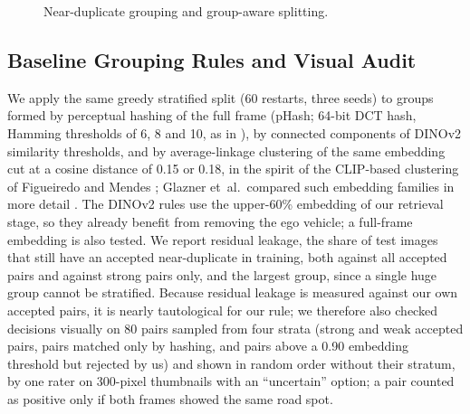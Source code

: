 \documentclass[conference,a4paper]{IEEEtran}
\begin{document}
\begin{figure}[t]
\centering
{}
\caption{Near-duplicate grouping and group-aware splitting.}
\label{fig:pipeline}
\end{figure}

\subsection{Baseline Grouping Rules and Visual Audit}
\label{sec:baselines}
We apply the same greedy stratified split (60 restarts, three seeds) to groups formed by perceptual hashing of the full frame (pHash; 64-bit DCT hash, Hamming thresholds of 6, 8 and 10, as in \cite{babu2024leakage}), by connected components of DINOv2 similarity thresholds, and by average-linkage clustering of the same embedding cut at a cosine distance of 0.15 or 0.18, in the spirit of the CLIP-based clustering of Figueiredo and Mendes \cite{figueiredo2024leakage}; Glazner et~al.\ compared such embedding families in more detail \cite{glazner2026findleak}. The DINOv2 rules use the upper-60\% embedding of our retrieval stage, so they already benefit from removing the ego vehicle; a full-frame embedding is also tested. We report residual leakage, the share of test images that still have an accepted near-duplicate in training, both against all accepted pairs and against strong pairs only, and the largest group, since a single huge group cannot be stratified. Because residual leakage is measured against our own accepted pairs, it is nearly tautological for our rule; we therefore also checked decisions visually on 80 pairs sampled from four strata (strong and weak accepted pairs, pairs matched only by hashing, and pairs above a 0.90 embedding threshold but rejected by us) and shown in random order without their stratum, by one rater on 300-pixel thumbnails with an ``uncertain'' option; a pair counted as positive only if both frames showed the same road spot.
\end{document}
